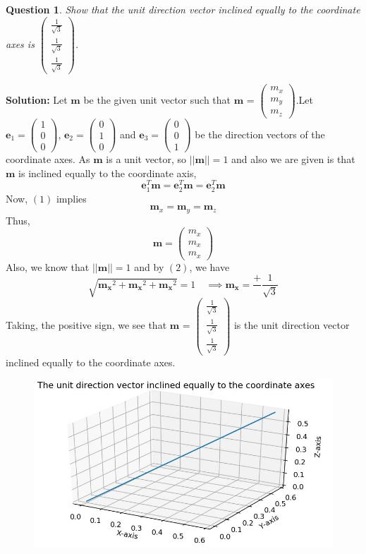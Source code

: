 \documentclass{article}
\newcommand{\solution}{\noindent \textbf{Solution: }}
\newtheorem{question}[theorem]{Question}
\newcommand{\myvec}[1]{\ensuremath{\begin{pmatrix}#1\end{pmatrix}}}
\let\vec\mathbf
\begin{document}
\begin{question}
	Show that the unit direction vector inclined equally to the coordinate axes is $\myvec{\frac{1}{\sqrt{3}} \\ \frac{1}{\sqrt{3}} \\ \frac{1}{\sqrt{3}}}$.
\end{question}
\solution Let $\vec{m}$ be the given unit vector such that $\vec{m}$ = $\myvec{m_x \\ m_y \\ m_z}$.Let $\vec{e}_1=\myvec{1 \\ 0 \\ 0}$, $\vec{e}_2=\myvec{0 \\ 1 \\ 0}$ and $\vec{e}_3=\myvec{0 \\ 0 \\ 1}$ be the direction vectors of the coordinate axes.
As $\vec{m}$ is a unit vector, so $||\vec{m}||=1$ and also we are given is that $\vec{m}$ is inclined equally to the coordinate axis, 
\begin{equation}
\vec{e}_1^T\vec{m} =\vec{e}_2^T\vec{m}=\vec{e}_2^T\vec{m}
\end{equation}
Now, $(1)$ implies 
\begin{equation*}
\vec m_x =  \vec m_y = \vec m_z
\end{equation*}	
Thus,
\begin{equation}
\vec m = \myvec{m_x \\ m_x \\ m_x}
\end{equation}
Also, we know that $||\vec{m}||=1$ and by $(2)$, we have
\begin{equation*}
\sqrt{\vec{m_x}^2 + \vec{m_x}^2 + \vec{m_x}^2} = 1 \quad \implies
\vec{m_x} = \frac{+}{} \frac{1}{\sqrt{3}}
\end{equation*}
Taking, the positive sign, we see that  $\vec{m}$ = $\myvec{ \frac{1}{\sqrt{3}} \\ \frac{1}{\sqrt{3}} \\ \frac{1}{\sqrt{3}}}$ is the unit direction vector inclined equally to the coordinate axes.\\
\begin{figure}[!htb]
	
	\centering
	
	\includegraphics[width=\columnwidth]{assignment1figure.jpg}
	
	\caption{\label{fig1}}
	
	\label{fig:}
	
\end{figure}
\end{document}
